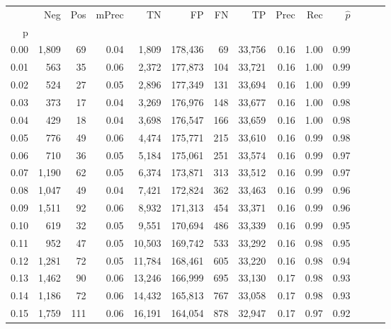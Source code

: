\begin{tabular}{rrrrrrrrrrrrrr}
\toprule
{} &    Neg &  Pos & mPrec &       TN &       FP &      FN &      TP &  Prec &   Rec & $\hat{p}$ \\
p    &        &      &       &          &          &         &         &       &       &           \\
\midrule
0.00 &  1,809 &   69 &  0.04 &    1,809 &  178,436 &      69 &  33,756 &  0.16 &  1.00 &      0.99 \\
0.01 &    563 &   35 &  0.06 &    2,372 &  177,873 &     104 &  33,721 &  0.16 &  1.00 &      0.99 \\
0.02 &    524 &   27 &  0.05 &    2,896 &  177,349 &     131 &  33,694 &  0.16 &  1.00 &      0.99 \\
0.03 &    373 &   17 &  0.04 &    3,269 &  176,976 &     148 &  33,677 &  0.16 &  1.00 &      0.98 \\
0.04 &    429 &   18 &  0.04 &    3,698 &  176,547 &     166 &  33,659 &  0.16 &  1.00 &      0.98 \\
0.05 &    776 &   49 &  0.06 &    4,474 &  175,771 &     215 &  33,610 &  0.16 &  0.99 &      0.98 \\
0.06 &    710 &   36 &  0.05 &    5,184 &  175,061 &     251 &  33,574 &  0.16 &  0.99 &      0.97 \\
0.07 &  1,190 &   62 &  0.05 &    6,374 &  173,871 &     313 &  33,512 &  0.16 &  0.99 &      0.97 \\
0.08 &  1,047 &   49 &  0.04 &    7,421 &  172,824 &     362 &  33,463 &  0.16 &  0.99 &      0.96 \\
0.09 &  1,511 &   92 &  0.06 &    8,932 &  171,313 &     454 &  33,371 &  0.16 &  0.99 &      0.96 \\
0.10 &    619 &   32 &  0.05 &    9,551 &  170,694 &     486 &  33,339 &  0.16 &  0.99 &      0.95 \\
0.11 &    952 &   47 &  0.05 &   10,503 &  169,742 &     533 &  33,292 &  0.16 &  0.98 &      0.95 \\
0.12 &  1,281 &   72 &  0.05 &   11,784 &  168,461 &     605 &  33,220 &  0.16 &  0.98 &      0.94 \\
0.13 &  1,462 &   90 &  0.06 &   13,246 &  166,999 &     695 &  33,130 &  0.17 &  0.98 &      0.93 \\
0.14 &  1,186 &   72 &  0.06 &   14,432 &  165,813 &     767 &  33,058 &  0.17 &  0.98 &      0.93 \\
0.15 &  1,759 &  111 &  0.06 &   16,191 &  164,054 &     878 &  32,947 &  0.17 &  0.97 &      0.92 \\

\end{tabular}
